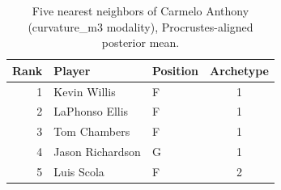 \begin{table}[htbp]
  \centering\small
  \begin{tabular}{rllc}
    \toprule
    Rank & Player & Position & Archetype \\
    \midrule
    1 & Kevin Willis & F & 1 \\
    2 & LaPhonso Ellis & F & 1 \\
    3 & Tom Chambers & F & 1 \\
    4 & Jason Richardson & G & 1 \\
    5 & Luis Scola & F & 2 \\
    \bottomrule
  \end{tabular}
  \caption{Five nearest neighbors of Carmelo Anthony (curvature_m3 modality), Procrustes-aligned posterior mean.}
  \label{tab:Carmelo_Anthony_neighbors_curvature_m3}
\end{table}

